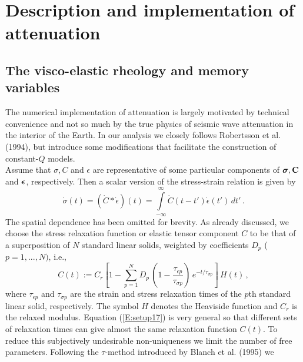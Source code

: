 \chapter{Description and implementation of attenuation}\label{C:attenuation}


\section{The visco-elastic rheology and memory variables}\label{S:attenuation}

The numerical implementation of attenuation is largely motivated by
technical convenience and not so much by the true physics of seismic
wave attenuation in the interior of the Earth. In our analysis we closely follows Robertsson et al. (1994),
but introduce some modifications that facilitate the construction of constant-$Q$ models.\\
Assume that $\sigma, C$ and $\epsilon$ are representative of some
particular components of $\boldsymbol{\sigma}, \mathbf{C}$ and $\boldsymbol{\epsilon}$,
respectively. Then a scalar version of the stress-strain relation is
given by
\begin{equation}\label{E:setup16}
\dot{\sigma}(t) = (\dot{C}*\dot{\epsilon})(t) =
\int\limits_{-\infty}^{\infty} \dot{C}(t-t') \dot{\epsilon}(t')\,
dt'\,.
\end{equation}
The spatial dependence has been omitted for brevity. As already
discussed, we choose the stress relaxation function or elastic
tensor component $C$ to be that of a superposition of $N$ standard
linear solids, weighted by coefficients $D_p$ ($p=1, ..., N)$, i.e.,
\begin{equation}\label{E:setup17}
C(t) := C_r \left[ 1- \sum_{p=1}^{N} D_p\, \left( 1-
\frac{\tau_{\epsilon p}}{\tau_{\sigma p}}\right)\,e^{-t/\tau_{\sigma
p}}\right] \, H(t)\,,
\end{equation}
where $\tau_{\epsilon p}$ and $\tau_{\sigma p}$ are the strain and
stress relaxation times of the $p$th standard linear solid,
respectively. The symbol $H$ denotes the Heaviside function and
$C_r$ is the relaxed modulus. Equation (\ref{E:setup17}) is very
general so that  different sets of relaxation times can give almost
the same relaxation function $C(t)$. To reduce this subjectively
undesirable non-uniqueness we limit the number of free parameters.
Following the $\tau$-method introduced by Blanch et al. (1995) we
